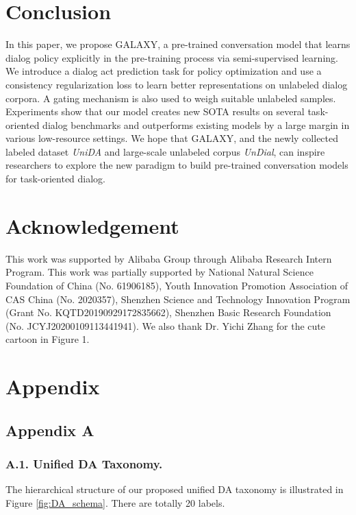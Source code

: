\documentclass[letterpaper]{article} \usepackage{aaai22}  \usepackage{times}  \usepackage{helvet}  \usepackage{courier}  \usepackage[hyphens]{url}  \usepackage{graphicx} \urlstyle{rm} \def\UrlFont{\rm}  \usepackage{natbib}  \usepackage{caption} \DeclareCaptionStyle{ruled}{labelfont=normalfont,labelsep=colon,strut=off} \frenchspacing  \setlength{\pdfpagewidth}{8.5in}  \setlength{\pdfpageheight}{11in}  \usepackage{algorithm}
\begin{document}
\section{Conclusion}
In this paper, we propose GALAXY, a  pre-trained conversation model that learns dialog policy explicitly in the pre-training process via semi-supervised learning.
We introduce a  dialog  act  prediction task for policy optimization
and use a consistency regularization loss to learn better representations on unlabeled dialog corpora. 
A gating mechanism is also used to weigh suitable unlabeled samples. 
Experiments show that our model creates new SOTA results on several task-oriented dialog benchmarks and outperforms existing models by a large margin in various low-resource settings.
We hope that GALAXY, and the newly collected labeled dataset \textit{UniDA} and large-scale unlabeled corpus \textit{UnDial},  can inspire researchers  to explore the new paradigm to build pre-trained conversation models for task-oriented dialog.








\newpage
\section*{Acknowledgement}
This work was supported by Alibaba Group through Alibaba Research Intern Program.
This work was partially supported by National Natural Science Foundation of China (No. 61906185), Youth Innovation Promotion Association of CAS China (No. 2020357), Shenzhen Science and Technology Innovation Program (Grant No. KQTD20190929172835662), Shenzhen Basic Research Foundation (No. JCYJ20200109113441941).
We also thank Dr. Yichi Zhang for the cute cartoon in Figure 1.


\clearpage
\section*{Appendix}
\subsection*{Appendix A}
\label{AppxA}
\subsubsection{A.1. Unified DA Taxonomy.}
\label{AppxA_1}

The hierarchical structure of our proposed unified DA taxonomy is illustrated in Figure \ref{fig:DA_schema}. There are totally 20 labels. 
\end{document}
